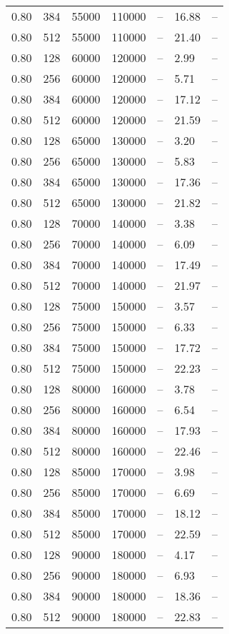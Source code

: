\begin{tabular}{l|l|l|l|l|l|l}
0.80 & 384 &  55000 & 110000 & -- & 16.88 & --\\
0.80 & 512 &  55000 & 110000 & -- & 21.40 & --\\
0.80 & 128 &  60000 & 120000 & -- &  2.99 & --\\
0.80 & 256 &  60000 & 120000 & -- &  5.71 & --\\
0.80 & 384 &  60000 & 120000 & -- & 17.12 & --\\
0.80 & 512 &  60000 & 120000 & -- & 21.59 & --\\
0.80 & 128 &  65000 & 130000 & -- &  3.20 & --\\
0.80 & 256 &  65000 & 130000 & -- &  5.83 & --\\
0.80 & 384 &  65000 & 130000 & -- & 17.36 & --\\
0.80 & 512 &  65000 & 130000 & -- & 21.82 & --\\
0.80 & 128 &  70000 & 140000 & -- &  3.38 & --\\
0.80 & 256 &  70000 & 140000 & -- &  6.09 & --\\
0.80 & 384 &  70000 & 140000 & -- & 17.49 & --\\
0.80 & 512 &  70000 & 140000 & -- & 21.97 & --\\
0.80 & 128 &  75000 & 150000 & -- &  3.57 & --\\
0.80 & 256 &  75000 & 150000 & -- &  6.33 & --\\
0.80 & 384 &  75000 & 150000 & -- & 17.72 & --\\
0.80 & 512 &  75000 & 150000 & -- & 22.23 & --\\
0.80 & 128 &  80000 & 160000 & -- &  3.78 & --\\
0.80 & 256 &  80000 & 160000 & -- &  6.54 & --\\
0.80 & 384 &  80000 & 160000 & -- & 17.93 & --\\
0.80 & 512 &  80000 & 160000 & -- & 22.46 & --\\
0.80 & 128 &  85000 & 170000 & -- &  3.98 & --\\
0.80 & 256 &  85000 & 170000 & -- &  6.69 & --\\
0.80 & 384 &  85000 & 170000 & -- & 18.12 & --\\
0.80 & 512 &  85000 & 170000 & -- & 22.59 & --\\
0.80 & 128 &  90000 & 180000 & -- &  4.17 & --\\
0.80 & 256 &  90000 & 180000 & -- &  6.93 & --\\
0.80 & 384 &  90000 & 180000 & -- & 18.36 & --\\
0.80 & 512 &  90000 & 180000 & -- & 22.83 & --\\

\end{tabular}
